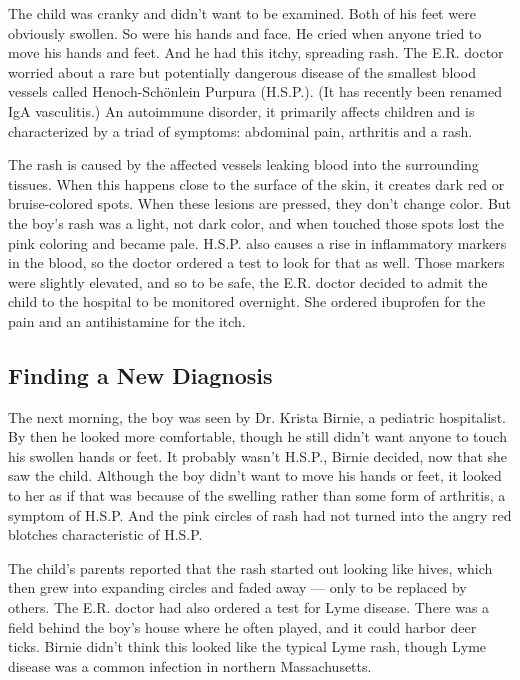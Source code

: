 The child was cranky and didn't want to be examined. Both of his feet
were obviously swollen. So were his hands and face. He cried when anyone
tried to move his hands and feet. And he had this itchy, spreading rash.
The E.R. doctor worried about a rare but potentially dangerous disease
of the smallest blood vessels called Henoch-Schönlein Purpura (H.S.P.).
(It has recently been renamed IgA vasculitis.) An autoimmune disorder,
it primarily affects children and is characterized by a triad of
symptoms: abdominal pain, arthritis and a rash.

The rash is caused by the affected vessels leaking blood into the
surrounding tissues. When this happens close to the surface of the skin,
it creates dark red or bruise-colored spots. When these lesions are
pressed, they don't change color. But the boy's rash was a light, not
dark color, and when touched those spots lost the pink coloring and
became pale. H.S.P. also causes a rise in inflammatory markers in the
blood, so the doctor ordered a test to look for that as well. Those
markers were slightly elevated, and so to be safe, the E.R. doctor
decided to admit the child to the hospital to be monitored overnight.
She ordered ibuprofen for the pain and an antihistamine for the itch.

\hypertarget{finding-a-new-diagnosis}{%
\subsection{\texorpdfstring{\textbf{Finding a New
Diagnosis}}{Finding a New Diagnosis}}\label{finding-a-new-diagnosis}}

The next morning, the boy was seen by Dr. Krista Birnie, a pediatric
hospitalist. By then he looked more comfortable, though he still didn't
want anyone to touch his swollen hands or feet. It probably wasn't
H.S.P., Birnie decided, now that she saw the child. Although the boy
didn't want to move his hands or feet, it looked to her as if that was
because of the swelling rather than some form of arthritis, a symptom of
H.S.P. And the pink circles of rash had not turned into the angry red
blotches characteristic of H.S.P.

The child's parents reported that the rash started out looking like
hives, which then grew into expanding circles and faded away --- only to
be replaced by others. The E.R. doctor had also ordered a test for Lyme
disease. There was a field behind the boy's house where he often played,
and it could harbor deer ticks. Birnie didn't think this looked like the
typical Lyme rash, though Lyme disease was a common infection in
northern Massachusetts.

